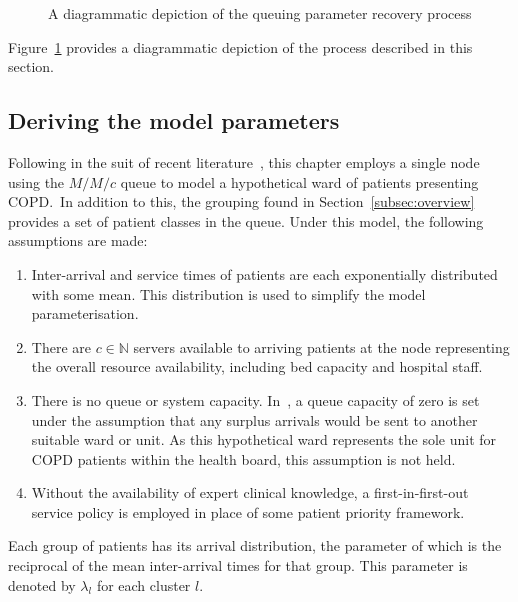 \begin{figure}
    \centering%
    \resizebox{!}{.9\textheight}{%
        
    }
    \caption{%
        A diagrammatic depiction of the queuing parameter recovery process
    }\label{fig:process}
\end{figure}

Figure~\ref{fig:process} provides a diagrammatic depiction of the process
described in this section.


\subsection{Deriving the model parameters}\label{subsec:derive}

Following in the suit of recent literature~\cite{}, this chapter employs a  %
single node using the \(M/M/c\) queue to model a hypothetical ward of patients
presenting COPD.\ In addition to this, the grouping found in
Section~\ref{subsec:overview} provides a set of patient classes in the queue.
Under this model, the following assumptions are made:
\begin{enumerate}
    \item Inter-arrival and service times of patients are each exponentially
        distributed with some mean. This distribution is used to simplify the
        model parameterisation.
    \item There are \(c \in \mathbb{N}\) servers available to arriving patients
        at the node representing the overall resource availability, including
        bed capacity and hospital staff.
    \item There is no queue or system capacity. In~\cite{Williams2015}, a
        queue capacity of zero is set under the assumption that any surplus
        arrivals would be sent to another suitable ward or unit. As this
        hypothetical ward represents the sole unit for COPD patients within the
        health board, this assumption is not held.
    \item Without the availability of expert clinical knowledge, a
        first-in-first-out service policy is employed in place of some patient
        priority framework.
\end{enumerate}

Each group of patients has its arrival distribution, the parameter of which is
the reciprocal of the mean inter-arrival times for that group. This parameter
is denoted by \(\lambda_l\) for each cluster \(l\).

